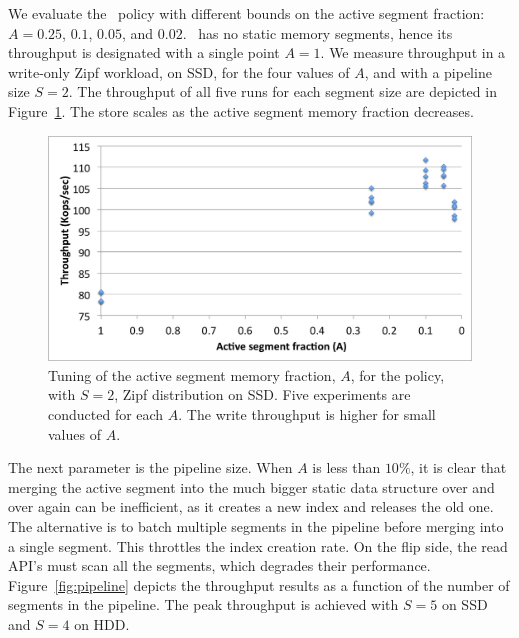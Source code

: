 We evaluate the \basic\ policy with different bounds on the active segment fraction: $A=0.25$, $0.1$, $0.05$, and $0.02$. 
\none\ has no static memory segments, hence its throughput is designated with a single point  $A=1$.
We measure  throughput in a write-only Zipf workload, on SSD,  for the four values of $A$, and with a pipeline size $S=2$.
The throughput of all five runs for each segment size are depicted in  Figure~\ref{fig:dynamic-fraction}. 
The store scales as the active segment memory fraction decreases. 

\begin{figure}[htb]
\includegraphics[width=\figw]{Figs/dynamic-fraction-1.png}
\caption{Tuning of the active segment memory fraction, $A$, for the \basic\/ policy, with $S=2$,
Zipf distribution on SSD.  Five experiments are conducted for each $A$. 
The write throughput is higher for small values of $A$.
}
\label{fig:dynamic-fraction}
\end{figure}

The next parameter is the pipeline size.
When $A$ is less than $10\%$, it is clear that merging the active segment into the much bigger static data structure
over and over again can be inefficient, as it creates a new index and releases the old one. 
The alternative is to batch multiple segments in the pipeline before merging into a single segment. 
This throttles the index creation rate. On the flip side, the read API's must scan all the segments, 
which degrades their performance.
Figure~\ref{fig:pipeline} depicts the throughput results as a function of the number of segments in the pipeline. 
The peak throughput is achieved with $S=5$ on SSD and $S=4$ on HDD.

